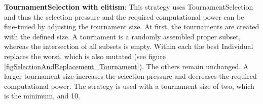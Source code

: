 \textbf{\Gls{TournamentSelection} with elitism}: This strategy uses \gls{TournamentSelection} and thus the selection pressure and the required computational power can be fine-tuned by adjusting the tournament size. At first, the tournaments are created with the defined size. A tournament is a randomly assembled proper subset, whereas the intersection of all subsets is empty. Within each the best \gls{Individual} replaces the worst, which is also mutated (see figure \ref{figSelectionAndReplacement_Tournament}). The others remain unchanged. A larger tournament size increases the selection pressure and decreases the required computational power. The strategy is used with a tournament size of two, which is the minimum, and 10.


	
	

